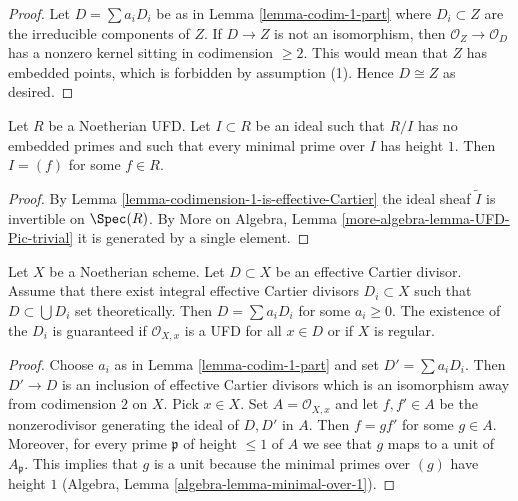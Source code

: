 \begin{proof}
Let $D = \sum a_i D_i$ be as in Lemma \ref{lemma-codim-1-part}
where $D_i \subset Z$ are the irreducible components of $Z$.
If $D \to Z$ is not an isomorphism, then $\mathcal{O}_Z \to \mathcal{O}_D$
has a nonzero kernel sitting in codimension $\geq 2$. This
would mean that $Z$ has embedded points, which is forbidden
by assumption (1). Hence $D \cong Z$ as desired.
\end{proof}

\begin{lemma}
\label{lemma-UFD-one-equation-CM}
Let $R$ be a Noetherian UFD. Let $I \subset R$ be an ideal
such that $R/I$ has no embedded primes and such that
every minimal prime over $I$ has height $1$.
Then $I = (f)$ for some $f \in R$.
\end{lemma}

\begin{proof}
By Lemma \ref{lemma-codimension-1-is-effective-Cartier}
the ideal sheaf $\tilde I$ is invertible on $\Spec(R)$.
By More on Algebra, Lemma \ref{more-algebra-lemma-UFD-Pic-trivial}
it is generated by a single element.
\end{proof}

\begin{lemma}
\label{lemma-effective-Cartier-divisor-is-a-sum}
Let $X$ be a Noetherian scheme. Let $D \subset X$ be an effective
Cartier divisor. Assume that there exist integral effective Cartier
divisors $D_i \subset X$ such that $D \subset \bigcup D_i$
set theoretically. Then $D = \sum a_i D_i$ for some $a_i \geq 0$.
The existence of the $D_i$ is guaranteed if $\mathcal{O}_{X, x}$
is a UFD for all $x \in D$ or if $X$ is regular.
\end{lemma}

\begin{proof}
Choose $a_i$ as in Lemma \ref{lemma-codim-1-part} and set $D' = \sum a_i D_i$.
Then $D' \to D$ is an inclusion of effective Cartier divisors which
is an isomorphism away from codimension $2$ on $X$. Pick $x \in X$.
Set $A = \mathcal{O}_{X, x}$ and let $f, f' \in A$ be the nonzerodivisor
generating the ideal of $D, D'$ in $A$. Then $f = gf'$ for some $g \in A$.
Moreover, for every prime $\mathfrak p$ of height $\leq 1$ of $A$ we see
that $g$ maps to a unit of $A_\mathfrak p$. This implies that $g$ is
a unit because the minimal primes over $(g)$ have height $1$
(Algebra, Lemma \ref{algebra-lemma-minimal-over-1}).
\end{proof}


